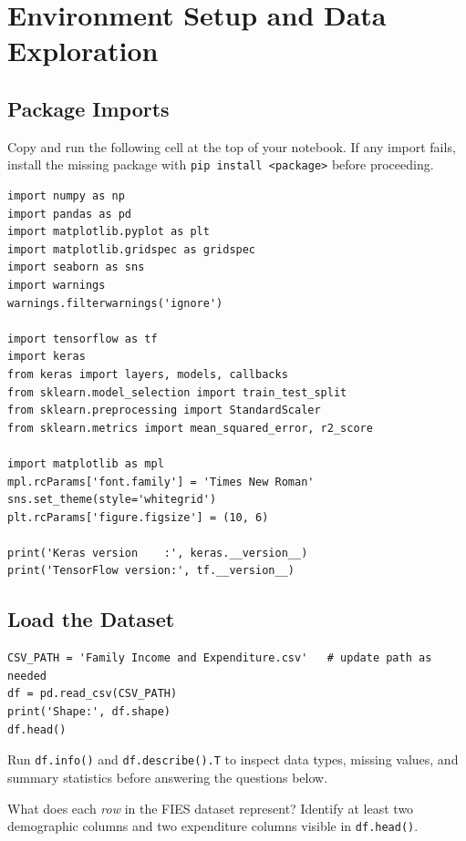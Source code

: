 \documentclass[12pt,a4paper]{article}
\begin{document}
\section{Environment Setup and Data Exploration}

\subsection{Package Imports}

Copy and run the following cell at the top of your notebook. If any import fails,
install the missing package with \texttt{pip install <package>} before proceeding.

\begin{lstlisting}[style=pythonstyle]
import numpy as np
import pandas as pd
import matplotlib.pyplot as plt
import matplotlib.gridspec as gridspec
import seaborn as sns
import warnings
warnings.filterwarnings('ignore')

import tensorflow as tf
import keras
from keras import layers, models, callbacks
from sklearn.model_selection import train_test_split
from sklearn.preprocessing import StandardScaler
from sklearn.metrics import mean_squared_error, r2_score

import matplotlib as mpl
mpl.rcParams['font.family'] = 'Times New Roman'
sns.set_theme(style='whitegrid')
plt.rcParams['figure.figsize'] = (10, 6)

print('Keras version    :', keras.__version__)
print('TensorFlow version:', tf.__version__)
\end{lstlisting}

\subsection{Load the Dataset}

\begin{lstlisting}[style=pythonstyle]
CSV_PATH = 'Family Income and Expenditure.csv'   # update path as needed
df = pd.read_csv(CSV_PATH)
print('Shape:', df.shape)
df.head()
\end{lstlisting}

Run \texttt{df.info()} and \texttt{df.describe().T} to inspect data types, missing values,
and summary statistics before answering the questions below.

\begin{tcolorbox}[colback=lightblue!40, colframe=myColorB, title={\textbf{Reflection Question 1}}, fonttitle=\small\bfseries, breakable]
What does each \emph{row} in the FIES dataset represent?
Identify at least two demographic columns and two expenditure columns visible in \texttt{df.head()}.
\end{tcolorbox}
\end{document}
